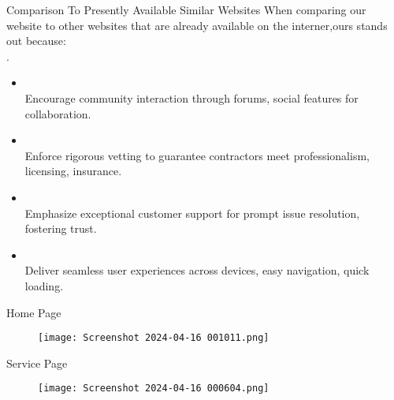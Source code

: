 \documentclass{beamer} %
\begin{document}
\begin{frame}{Comparison To Presently Available Similar Websites}
    When comparing our website to other websites that are already available on the interner,ours stands out because:\\.
     \begin{minipage}{1\textwidth}
            \begin{itemize}
                \item \\Encourage community interaction through forums, social features for collaboration.

                \item \\Enforce rigorous vetting to guarantee contractors meet professionalism, licensing, insurance.

                \item \\Emphasize exceptional customer support for prompt issue resolution, fostering trust.

                \item \\Deliver seamless user experiences across devices, easy navigation, quick loading.

            \end{itemize}
        \end{minipage}
    
    \vspace{10pt} %
    \begin{figure}
        \hfill
    \end{figure}
    
\end{frame}
\begin{frame}{Home Page}
    \vspace{5pt} %
    \begin{figure}
    
        \texttt{[image: Screenshot 2024-04-16 001011.png]}
    \end{figure}  
\end{frame}

\begin{frame}{Service Page}
    \vspace{5pt} %
    \begin{figure}
    
        \texttt{[image: Screenshot 2024-04-16 000604.png]}
    \end{figure}  
\end{frame}
\end{document}
